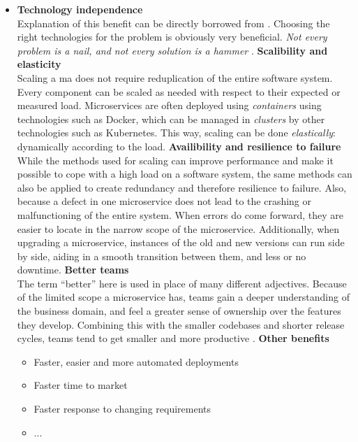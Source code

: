 \begin{itemize}
    \item \textbf{Technology independence}\\
    Explanation of this benefit can be directly borrowed from
    . Choosing the right technologies for the problem
    is obviously very beneficial. \textit{Not every problem is a nail, and not
    every solution is a hammer} \autocite{Fowler_Microservices_2014}. 
    \spacedItem \textbf{Scalibility and elasticity}\\
    Scaling a \gls{ma} does not require reduplication of the entire software
    system. Every component can be scaled as needed with respect to their
    expected or measured load. Microservices are often deployed using
    \textit{containers} using technologies such as
    Docker, which can be managed in
    \textit{clusters} by other technologies such as
    Kubernetes. This way, scaling can be
    done \textit{elastically}: dynamically according to the load.
    \autocite{Dragoni_etal_2018}
    \spacedItem \textbf{Availibility and resilience to failure}\\
    While the methods used for scaling can improve performance and make it
    possible to cope with a high load on a software system, the same methods can
    also be applied to create redundancy and therefore resilience to failure.
    Also, because a defect in one \gls{microservice} does not lead to the
    crashing or malfunctioning of the entire system. When errors do come
    forward, they are easier to locate in the narrow scope of the
    \gls{microservice}. Additionally, when upgrading a microservice,
    instances of the old and new versions can run side by side, aiding in a
    smooth transition between them, and less or no downtime.
    \autocite{Dragoni_etal_2017}
    \spacedItem \textbf{Better teams}\\
    The term ``better'' here is used in place of many different adjectives.
    Because of the limited scope a \gls{microservice} has, teams gain a deeper
    understanding of the business domain, and feel a greater sense of ownership
    over the features they develop. Combining this with the smaller codebases
    and shorter release cycles, teams tend to get smaller and more productive
    \autocite{Newman_2015}.
    \spacedItem  \textbf{Other benefits}
    \begin{itemize}
        \item Faster, easier and more automated deployments
        \item Faster time to market
        \item Faster response to changing requirements
        \item ...
    \end{itemize}
\end{itemize}

